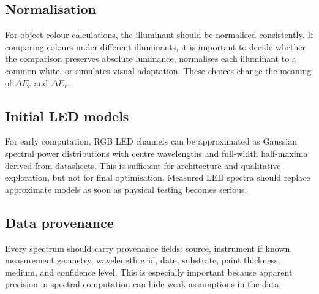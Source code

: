 \documentclass[11pt,a4paper]{article}
\newcommand{\DE}{\Delta E}
\begin{document}
\subsection{Normalisation}

For object-colour calculations, the illuminant should be normalised consistently. If comparing colours under different illuminants, it is important to decide whether the comparison preserves absolute luminance, normalises each illuminant to a common white, or simulates visual adaptation. These choices change the meaning of $\DE_c$ and $\DE_r$.

\subsection{Initial LED models}

For early computation, RGB LED channels can be approximated as Gaussian spectral power distributions with centre wavelengths and full-width half-maxima derived from datasheets. This is sufficient for architecture and qualitative exploration, but not for final optimisation. Measured LED spectra should replace approximate models as soon as physical testing becomes serious.

\subsection{Data provenance}

Every spectrum should carry provenance fields: source, instrument if known, measurement geometry, wavelength grid, date, substrate, paint thickness, medium, and confidence level. This is especially important because apparent precision in spectral computation can hide weak assumptions in the data.

\printbibliography
\end{document}
